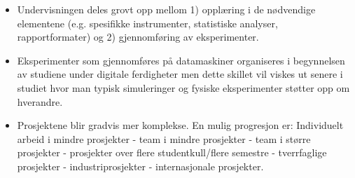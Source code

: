 \begin{itemize}
	\item Undervisningen deles grovt opp mellom 1) opplæring i de nødvendige elementene (e.g. spesifikke instrumenter, statistiske analyser, rapportformater) og 2) gjennomføring av eksperimenter.
	\item Eksperimenter som gjennomføres på datamaskiner organiseres i begynnelsen av studiene under digitale ferdigheter men dette skillet vil viskes ut senere i studiet hvor man typisk simuleringer og fysiske eksperimenter støtter opp om hverandre.
	\item Prosjektene blir gradvis mer komplekse. En mulig progresjon er: Individuelt arbeid i mindre prosjekter - team i mindre prosjekter - team i større prosjekter - prosjekter over flere studentkull/flere semestre - tverrfaglige prosjekter - industriprosjekter - internasjonale prosjekter.
\end{itemize}


